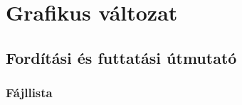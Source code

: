 %
\chapter{Grafikus változat}

\thispagestyle{fancy}

\section{Fordítási és futtatási útmutató}

\subsection{Fájllista}

